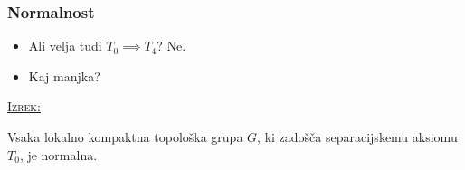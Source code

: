 \documentclass[a4paper, 12pt]{beamer}
\newenvironment{matematika}[1]{
\textcolor{bostonuniversityred}{\underline{\textsc{#1:}}}
}{
}
\begin{document}
\begin{frame}
\frametitle{Normalnost}
\begin{itemize}[label=]
\item Ali velja tudi $T_0 \implies T_4$? \pause Ne. \pause
\item Kaj manjka? \newline \pause
\end{itemize}

\begin{matematika}{Izrek}
Vsaka lokalno kompaktna topološka grupa $G$, ki zadošča separacijskemu aksiomu $T_0$, je normalna.
\end{matematika}
\end{frame}
\end{document}
